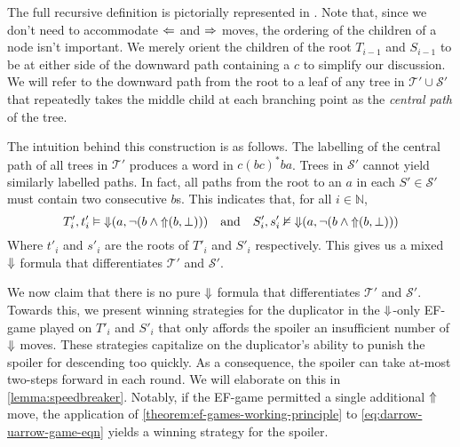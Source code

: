 \documentclass[a4paper,UKenglish,cleveref, autoref, thm-restate, numberwithinsect]{lipics-v2021}
\def\Larrow{\ensuremath\mathord{\Leftarrow}}
\def\Rarrow{\ensuremath\mathord{\Rightarrow}}
\def\Uarrow{\ensuremath\mathord{\Uparrow}}
\def\Darrow{\ensuremath\mathord{\Downarrow}}
\begin{document}
The full recursive definition is pictorially represented in . Note that, since we don't need to accommodate $\Larrow$ and $\Rarrow$ moves, the ordering of the children of a node isn't important. We merely orient the children of the root $T_{i - 1}$ and $S_{i - 1}$ to be at either side of the downward path containing a $c$ to simplify our discussion. We will refer to the downward path from the root to a leaf of any tree in $\mathcal{T}' \cup \mathcal{S}'$ that repeatedly takes the middle child at each branching point as the \textit{central path} of the tree.

The intuition behind this construction is as follows. The labelling of the central path of all trees in $\mathcal{T}'$ produces a word in $c (bc)^* ba$. Trees in $\mathcal{S}'$ cannot yield similarly labelled paths. In fact, all paths from the root to an $a$ in each $S' \in \mathcal{S}'$ must contain two consecutive $b$s. This indicates that, for all $i \in \mathbb{N}$,
\begin{equation}
    \label{eq:darrow-uarrow-game-eqn}
    T'_i, t'_i \vDash \Darrow(a, \lnot(b \land \Uarrow(b, \bot))) \quad \text{and} \quad S'_i, s'_i \nvDash \Darrow(a, \lnot(b \land \Uarrow(b, \bot)))
\end{equation}
Where $t'_i$ and $s'_i$ are the roots of $T'_i$ and $S'_i$ respectively. This gives us a mixed $\Darrow$ formula that differentiates $\mathcal{T}'$ and $\mathcal{S}'$.

We now claim that there is no pure $\Darrow$ formula that differentiates $\mathcal{T}'$ and $\mathcal{S}'$. Towards this, we present winning strategies for the duplicator in the $\Darrow$-only EF-game played on $T'_i$ and $S'_i$ that only affords the spoiler an insufficient number of $\Darrow$ moves. These strategies capitalize on the duplicator's ability to punish the spoiler for descending too quickly. As a consequence, the spoiler can take at-most two-steps forward in each round. We will elaborate on this in \cref{lemma:speedbreaker}. Notably, if the EF-game permitted a single additional $\Uarrow$ move, the application of \cref{theorem:ef-games-working-principle} to \cref{eq:darrow-uarrow-game-eqn} yields a winning strategy for the spoiler.
\end{document}
